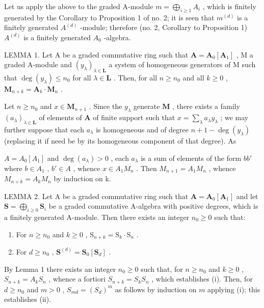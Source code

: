 Let us apply the above to the graded A-module \(m = \bigoplus_{i \geqslant 1} A_i\) , which is finitely generated by the Corollary to Proposition 1 of no. 2; it is seen that \(m^{(d)}\) is a finitely generated \(A^{(d)}\) -module; therefore (no. 2, Corollary to Proposition 1) \(A^{(d)}\) is a finitely generated \(A_0\) -algebra.

LEMMA 1. Let A be a graded commutative ring such that \(\mathbf{A} = \mathbf{A}_0[\mathbf{A}_1]\) , M a graded A-module and \((y_{\lambda})_{\lambda \in \mathbf{L}}\) a system of homogeneous generators of M such that \(\deg(y_{\lambda}) \leqslant n_0\) for all \(\lambda \in \mathbf{L}\) . Then, for all \(n \geqslant n_0\) and all \(k \geqslant 0\) , \(\mathbf{M}_{n+k} = \mathbf{A}_k \cdot \mathbf{M}_n\) .

Let \(n \geqslant n_0\) and \(x \in \mathbf{M}_{n+1}\) . Since the \(y_\lambda\) generate \(\mathbf{M}\) , there exists a family \((a_\lambda)_{\lambda \in \mathbf{L}}\) of elements of \(\mathbf{A}\) of finite support such that \(x = \sum_{\lambda} a_\lambda y_\lambda\) ; we may further suppose that each \(a_\lambda\) is homogeneous and of degree \(n + 1 - \deg(y_\lambda)\) (replacing it if need be by its homogeneous component of that degree). As

\(A = A_{0}[A_{1}]\) and \(\deg(a_{\lambda}) > 0\) , each \(a_{\lambda}\) is a sum of elements of the form \(bb'\) where \(b \in A_{1}\) , \(b' \in A\) , whence \(x \in A_{1}M_{n}\) . Then \(M_{n+1} = A_{1}M_{n}\) , whence \(M_{n+k} = A_{k}M_{n}\) by induction on k.

LEMMA 2. Let A be a graded commutative ring such that \(\mathbf{A} = \mathbf{A}_0[\mathbf{A}_1]\) and let \(\mathbf{S} = \bigoplus_{i\geqslant 0}\mathbf{S}_i\) be a graded commutative A-algebra with positive degrees, which is a finitely generated A-module. Then there exists an integer \(n_0\geqslant 0\) such that:

\begin{enumerate}
\def\labelenumi{(\roman{enumi})}
\item
  For \(n \geqslant n_0\) and \(k \geqslant 0\) , \(\mathrm{S}_{n+k} = \mathrm{S}_k \cdot \mathrm{S}_n\) .
\item
  For \(d \geqslant n_0\) , \(\mathbf{S}^{(d)} = \mathbf{S}_0[\mathbf{S}_d]\) .
\end{enumerate}

By Lemma 1 there exists an integer \(n_0 \geqslant 0\) such that, for \(n \geqslant n_0\) and \(k \geqslant 0\) , \(S_{n+k} = A_kS_n\) , whence a fortiori \(S_{n+k} = S_kS_n\) , which establishes (i). Then, for \(d \geqslant n_0\) and \(m > 0\) , \(S_{md} = (S_d)^m\) as follows by induction on \(m\) applying (i); this establishes (ii).

